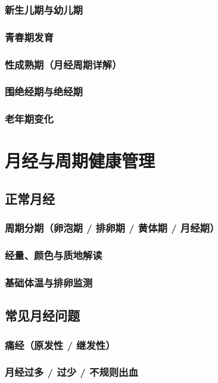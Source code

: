 \subsection{新生儿期与幼儿期}
\subsection{青春期发育}
\subsection{性成熟期（月经周期详解）}
\subsection{围绝经期与绝经期}
\subsection{老年期变化}

\chapter{月经与周期健康管理}

\section{正常月经}
\subsection{周期分期（卵泡期 / 排卵期 / 黄体期 / 月经期）}
\subsection{经量、颜色与质地解读}
\subsection{基础体温与排卵监测}

\section{常见月经问题}
\subsection{痛经（原发性 / 继发性）}
\subsection{月经过多 / 过少 / 不规则出血}
